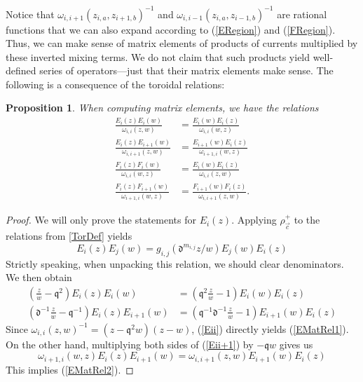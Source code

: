 \documentclass{amsart}
\newcommand{\qqq}{\mathfrak{q}}
\newcommand{\ddd}{\mathfrak{d}}
\newtheorem{prop}[thm]{Proposition}
\theoremstyle{remark}
\numberwithin{thm}{section}
\numberwithin{equation}{section}
\begin{document}
Notice that $\omega_{i,i+1}(z_{i,a},z_{i+1,b})^{-1}$ and $\omega_{i,i-1}(z_{i,a},z_{i-1,b})^{-1}$ are rational functions that we can also expand according to (\ref{ERegion}) and (\ref{FRegion}).
Thus, we can make sense of matrix elements of products of currents multiplied by these inverted mixing terms.
We do not claim that such products yield well-defined series of operators---just that their matrix elements make sense.
The following is a consequence of the toroidal relations:
\begin{prop}\label{DenomRel}
When computing matrix elements, we have the relations
\begin{align}
\label{EMatRel1}
\frac{E_{i}(z)E_i(w)}{\omega_{i,i}(z,w)}&=\frac{E_{i}(w)E_i(z)}{\omega_{i,i}(w,z)}\\
\label{EMatRel2}
\frac{E_{i}(z)E_{i+1}(w)}{\omega_{i,i+1}(z,w)}&= \frac{E_{i+1}(w)E_{i}(z)}{\omega_{i+1,i}(w,z)}\\
\nonumber
\frac{F_{i}(z)F_i(w)}{\omega_{i,i}(w,z)}&=\frac{E_{i}(w)E_i(z)}{\omega_{i,i}(z,w)}\\
\nonumber
\frac{F_{i}(z)F_{i+1}(w)}{\omega_{i+1,i}(w,z)}&= \frac{F_{i+1}(w)F_{i}(z)}{\omega_{i,i+1}(z,w)}.
\end{align}
\end{prop}

\begin{proof}
   We will only prove the statements for $E_i(z)$.
   Applying $\rho_{\vec{c}}^+$ to the relations from \ref{TorDef} yields
   \[
   E_i(z)E_j(w)=g_{i,j}(\ddd^{m_{i,j}}z/w)E_j(w)E_i(z)
   \]
   Strictly speaking, when unpacking this relation, we should clear denominators.
   We then obtain
   \begin{align}
    \label{Eii}
       \left(\frac{z}{w}-\qqq^2\right)E_i(z)E_i(w)&=\left(\qqq^2\frac{z}{w}-1\right) E_i(w)E_i(z)\\
    \label{Eii+1}
       \left(\ddd^{-1}\frac{z}{w}-\qqq^{-1}\right)E_{i}(z)E_{i+1}(w)&=\left(\qqq^{-1}\ddd^{-1}\frac{z}{w}-1\right)E_{i+1}(w)E_i(z)
   \end{align}
   Since $\omega_{i,i}(z,w)^{-1}=(z-\qqq^2w)(z-w)$, (\ref{Eii}) directly yields (\ref{EMatRel1}).
   On the other hand, multiplying both sides of (\ref{Eii+1}) by $-\qqq w$ gives us
   \[
   \omega_{i+1,i}(w,z)E_i(z)E_{i+1}(w)=\omega_{i,i+1}(z,w)E_{i+1}(w)E_i(z)
   \]
   This implies (\ref{EMatRel2}).
\end{proof}
\end{document}
